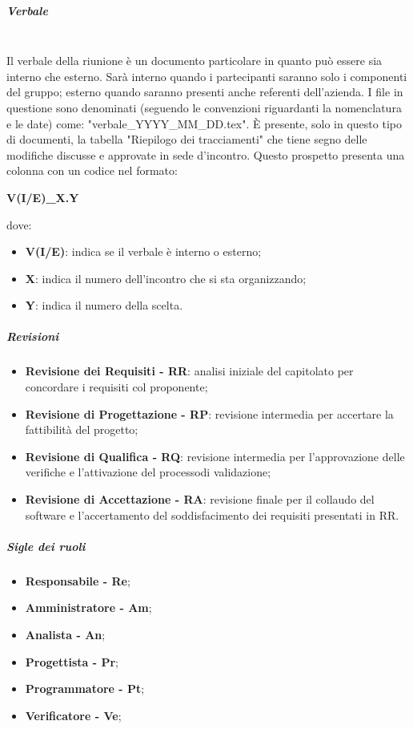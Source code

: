                 \subparagraph{Verbale}\mbox{}\\ [1mm]
                    Il verbale della riunione è un documento particolare in quanto può essere sia interno che esterno. Sarà interno quando
                    i partecipanti saranno solo i componenti del gruppo; esterno quando saranno presenti anche referenti dell'azienda. I file in questione sono denominati (seguendo le convenzioni riguardanti la nomenclatura e le date) come: "verbale\_YYYY\_MM\_DD.tex".
                    È presente, solo in questo tipo di documenti, la tabella "Riepilogo dei tracciamenti" che tiene segno delle modifiche discusse e
                    approvate in sede d'incontro. Questo prospetto presenta una colonna con un codice nel formato: \newline \newline
                    \centerline{\textbf{V(I/E)\_X.Y}} \newline \newline
                    dove:
                    \begin{itemize}
                        \item \textbf{V(I/E)}: indica se il verbale è interno o esterno;
                        \item \textbf{X}: indica il numero dell'incontro che si sta organizzando;
                        \item \textbf{Y}: indica il numero della scelta.
                    \end{itemize}
                \subparagraph{Revisioni}
                \begin{itemize}
                    \item \textbf{Revisione dei Requisiti - RR}: analisi iniziale del capitolato per concordare i requisiti col proponente;
                    \item \textbf{Revisione di Progettazione - RP}: revisione intermedia per accertare la fattibilità del progetto\glo;
                    \item \textbf{Revisione di Qualifica - RQ}: revisione intermedia per l'approvazione delle verifiche e l'attivazione del processo\glosp di validazione\glo;
                    \item \textbf{Revisione di Accettazione - RA}: revisione finale per il collaudo del software e l'accertamento del soddisfacimento dei requisiti presentati in RR.
                \end{itemize}
                \subparagraph{Sigle dei ruoli}
                    \begin{itemize}
                        \item \textbf{Responsabile - Re};
                        \item \textbf{Amministratore - Am};
                        \item \textbf{Analista - An};
                        \item \textbf{Progettista - Pr};
                        \item \textbf{Programmatore - Pt};
                        \item \textbf{Verificatore - Ve};
                    \end{itemize}
